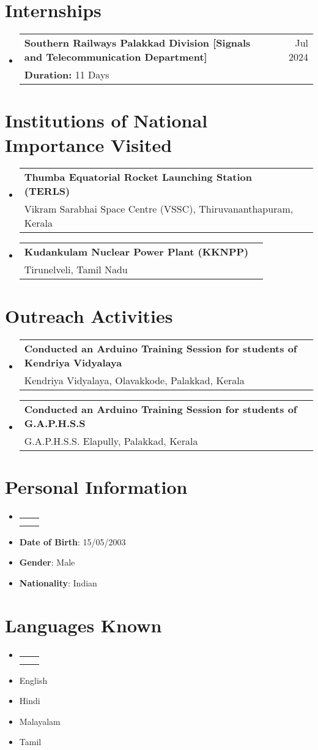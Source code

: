 \documentclass[A4,11pt]{article}
\makeatletter
\newcommand{\CVItem}[1]{
	\item\small{
		{#1 \vspace{-2pt}}
	}
}
\newcommand{\CVSubheading}[4]{
	\vspace{-2pt}\item
	\begin{tabular*}{0.97\textwidth}[t]{l@{\extracolsep{\fill}}r}
		\textbf{#1} & #2 \\
		\small#3 & \small #4 \\
	\end{tabular*}\vspace{-7pt}
}
\newcommand{\CVSubItem}[1]{\CVItem{#1}\vspace{-4pt}}
\newcommand{\CVSubHeadingListStart}{\begin{itemize}[leftmargin=0.5cm, label={}]}
\newcommand{\CVSubHeadingListEnd}{\end{itemize}}
\makeatother
\begin{document}
		\section{Internships}
		\CVSubHeadingListStart
		\CVSubheading
		{\textbf{Southern Railways Palakkad Division} [Signals and Telecommunication Department]}{\small Jul 2024}
		{\textbf{Duration:} 11 Days}{}
		\CVSubHeadingListEnd
		
		\section{Institutions of National Importance Visited}
		\CVSubHeadingListStart
		\CVSubheading
		{Thumba Equatorial Rocket Launching Station (TERLS)}{}
		{Vikram Sarabhai Space Centre (VSSC), Thiruvananthapuram, Kerala}{}
		\CVSubheading
		{Kudankulam Nuclear Power Plant (KKNPP)}{}
		{Tirunelveli, Tamil Nadu}{}
		\CVSubHeadingListEnd
		
		\section{Outreach Activities}
		\CVSubHeadingListStart
		\CVSubheading
		{Conducted an Arduino Training Session for students of Kendriya Vidyalaya}{}
		{Kendriya Vidyalaya, Olavakkode, Palakkad, Kerala}{}
		\CVSubheading
		{Conducted an Arduino Training Session for students of G.A.P.H.S.S}{}
		{G.A.P.H.S.S. Elapully, Palakkad, Kerala}{}
		\CVSubHeadingListEnd
		
		\section{Personal Information}

		\CVSubHeadingListStart
		\CVSubheading
		{}{}
		{}{}
		\vspace{-30pt}
		\CVSubItem{\normalsize \textbf{Date of Birth}: 15/05/2003}
		\CVSubItem{\normalsize \textbf{Gender}: Male}
		\CVSubItem{\normalsize \textbf{Nationality}: Indian}
		\CVSubHeadingListEnd
		
		\section{Languages Known}
		
		\CVSubHeadingListStart
		\CVSubheading
		{}{}
		{}{}
		\vspace{-30pt}
		\CVSubItem{\normalsize English}
		\CVSubItem{\normalsize Hindi}
		\CVSubItem{\normalsize Malayalam}
		\CVSubItem{\normalsize Tamil}
		\CVSubHeadingListEnd
		
		
		
	
\end{document}
